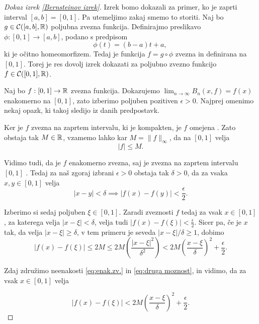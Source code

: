 \documentclass[a4paper, reqno]{amsart}
\theoremstyle{theorem}
\theoremstyle{definition}
\begin{document}
\begin{proof}[Dokaz \emph{izrek \ref{Bernsteinov izrek}}]

\par
Izrek bomo dokazali za primer, ko je zaprti interval $[a,b] = [0,1]$. Pa utemeljimo
zakaj smemo to storiti. Naj bo $g \in \mathcal{C}([a,b],\mathbb{R})$ poljubna zvezna funkcija. 
Definirajmo preslikavo $\phi: [0,1] \to [a,b]$, podano s predpisom
$$ \phi(t) = (b - a)t + a \text{, }$$
ki je očitno homeomorfizem. Tedaj je funkcija $f = g \circ \phi$ zvezna in definirana
na $[0,1]$. Torej je res dovolj izrek dokazati za poljubno zvezno funkcijo $f \in \mathcal{C}([0,1],\mathbb{R})$. 

\par
Naj bo $f : [0,1] \to \mathbb{R}$ zvezna funkcija. Dokazujemo $\lim_{n\to\infty}B_n(x, f) = f(x)$
enakomerno na $[0,1]$, zato izberimo poljuben pozitiven $\epsilon > 0$. Najprej
omenimo nekaj opazk, ki takoj sledijo iz danih predpostavk.

\par
Ker je $f$ zvezna na zaprtem intervalu, ki je kompakten, je $f$ omejena \cite[Izrek 30]{Ana1Skripta}.
Zato obstaja tak $M \in \mathbb{R}$, vzamemo lahko kar $M = \|f\|_{\infty}$, da na $[0,1]$ velja
$$ |f| \leq M \text{.}$$
\par
Vidimo tudi, da je $f$ enakomerno zvezna, saj je zvezna na zaprtem intervalu $[0,1]$ 
\cite[Izrek 28]{Ana1Skripta}.
Tedaj za naš zgoraj izbrani $\epsilon > 0$ obstaja tak $\delta > 0$, da za vsaka 
$x, y \in [0,1]$ velja
\begin{equation}
	\label{eq:enak.zv.}
	|x - y| < \delta \implies |f(x) - f(y)| < \frac{\epsilon}{2}\text{.}
\end{equation}

\par
Izberimo si sedaj poljuben $\xi \in [0,1]$. Zaradi zveznosti $f$ tedaj za vsak
$x \in [0,1]$, za katerega velja $|x - \xi| < \delta$, velja tudi 
$|f(x) - f(\xi)| < \frac{\epsilon}{2}$. Sicer pa, če je $x$ tak, da velja
$|x - \xi| \geq \delta$, v tem primeru je seveda $|x - \xi|/\delta \geq 1$, dobimo
\begin{equation}
	\label{eq:druga moznost}
	|f(x) - f(\xi)| \leq 2M \leq 2M\left(\frac{|x - \xi|^2}{\delta^2}\right) <
	2M\left(\frac{x - \xi}{\delta}\right)^2 + \frac{\epsilon}{2}\text{.}
\end{equation}

Zdaj združimo neenakosti \eqref{eq:enak.zv.} in \eqref{eq:druga moznost},
in vidimo, da za vsak $x \in [0,1]$ velja

\begin{equation}
	\label{eq:f neenakost}
	|f(x) - f(\xi)| < 2M\left( \frac{x - \xi}{\delta}\right)^2 + \frac{\epsilon}{2}\text{.}
\end{equation}


\end{proof}
\end{document}
